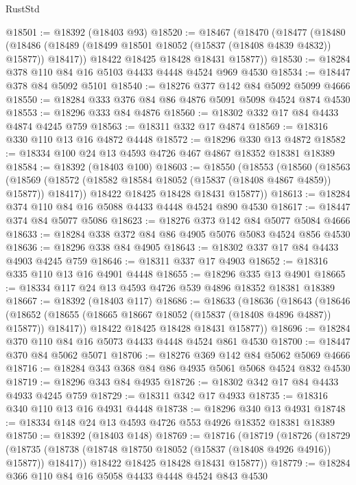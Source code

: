 \begin{lexlean}{RustStd}
\begin{coremodule}
@18501 := @18392 (@18403 @93)
@18520 := @18467
    (@18470
      (@18477
        (@18480
          (@18486 (@18489 (@18499 @18501 @18052 (@15837 (@18408 @4839 @4832)) @15877)) @18417))
        @18422
        @18425
        @18428
        @18431
        @15877))
@18530 := @18284 @378 @110 @84 @16 @5103 @4433 @4448 @4524 @969 @4530
@18534 := @18447 @378 @84 @5092 @5101
@18540 := @18276 @377 @142 @84 @5092 @5099 @4666
@18550 := @18284 @333 @376 @84 @86 @4876 @5091 @5098 @4524 @874 @4530
@18553 := @18296 @333 @84 @4876
@18560 := @18302 @332 @17 @84 @4433 @4874 @4245 @759
@18563 := @18311 @332 @17 @4874
@18569 := @18316 @330 @110 @13 @16 @4872 @4448
@18572 := @18296 @330 @13 @4872
@18582 := @18334 @100 @24 @13 @4593 @4726 @467 @4867 @18352 @18381 @18389
@18584 := @18392 (@18403 @100)
@18603 := @18550
    (@18553
      (@18560
        (@18563
          (@18569 (@18572 (@18582 @18584 @18052 (@15837 (@18408 @4867 @4859)) @15877)) @18417))
        @18422
        @18425
        @18428
        @18431
        @15877))
@18613 := @18284 @374 @110 @84 @16 @5088 @4433 @4448 @4524 @890 @4530
@18617 := @18447 @374 @84 @5077 @5086
@18623 := @18276 @373 @142 @84 @5077 @5084 @4666
@18633 := @18284 @338 @372 @84 @86 @4905 @5076 @5083 @4524 @856 @4530
@18636 := @18296 @338 @84 @4905
@18643 := @18302 @337 @17 @84 @4433 @4903 @4245 @759
@18646 := @18311 @337 @17 @4903
@18652 := @18316 @335 @110 @13 @16 @4901 @4448
@18655 := @18296 @335 @13 @4901
@18665 := @18334 @117 @24 @13 @4593 @4726 @539 @4896 @18352 @18381 @18389
@18667 := @18392 (@18403 @117)
@18686 := @18633
    (@18636
      (@18643
        (@18646
          (@18652 (@18655 (@18665 @18667 @18052 (@15837 (@18408 @4896 @4887)) @15877)) @18417))
        @18422
        @18425
        @18428
        @18431
        @15877))
@18696 := @18284 @370 @110 @84 @16 @5073 @4433 @4448 @4524 @861 @4530
@18700 := @18447 @370 @84 @5062 @5071
@18706 := @18276 @369 @142 @84 @5062 @5069 @4666
@18716 := @18284 @343 @368 @84 @86 @4935 @5061 @5068 @4524 @832 @4530
@18719 := @18296 @343 @84 @4935
@18726 := @18302 @342 @17 @84 @4433 @4933 @4245 @759
@18729 := @18311 @342 @17 @4933
@18735 := @18316 @340 @110 @13 @16 @4931 @4448
@18738 := @18296 @340 @13 @4931
@18748 := @18334 @148 @24 @13 @4593 @4726 @553 @4926 @18352 @18381 @18389
@18750 := @18392 (@18403 @148)
@18769 := @18716
    (@18719
      (@18726
        (@18729
          (@18735 (@18738 (@18748 @18750 @18052 (@15837 (@18408 @4926 @4916)) @15877)) @18417))
        @18422
        @18425
        @18428
        @18431
        @15877))
@18779 := @18284 @366 @110 @84 @16 @5058 @4433 @4448 @4524 @843 @4530

\end{coremodule}
\end{lexlean}
